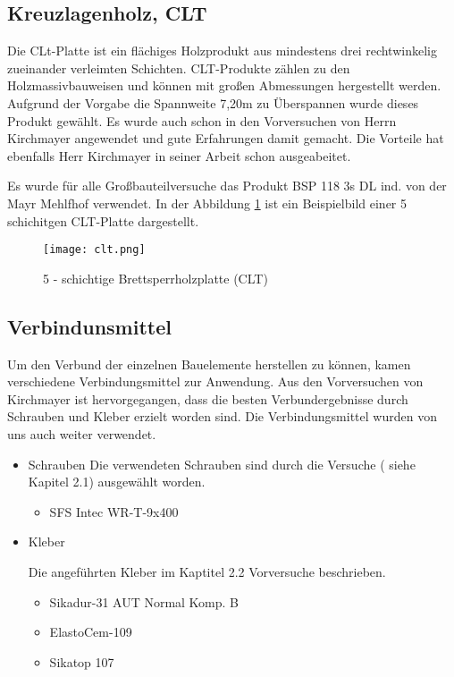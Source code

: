 \documentclass[12 pt,a4 paper ]{scrreprt}
\begin{document}
\subsection{Kreuzlagenholz, CLT}

Die CLt-Platte ist ein flächiges Holzprodukt aus mindestens drei rechtwinkelig zueinander verleimten Schichten. CLT-Produkte zählen zu den Holzmassivbauweisen und können mit großen Abmessungen hergestellt werden. Aufgrund der Vorgabe die Spannweite 7,20m zu Überspannen wurde dieses Produkt gewählt. Es wurde auch schon in den Vorversuchen von Herrn Kirchmayer angewendet und gute Erfahrungen damit gemacht. Die Vorteile hat ebenfalls Herr Kirchmayer in seiner Arbeit schon ausgeabeitet.

Es wurde für alle Großbauteilversuche das Produkt BSP 118 3s DL ind. von der Mayr Mehlfhof  verwendet. In der Abbildung \ref{clt} ist ein Beispielbild einer 5 schichitgen CLT-Platte dargestellt.

\begin{figure}[h]
\begin{center}
\texttt{[image: clt.png]}
\caption{5 - schichtige Brettsperrholzplatte (CLT)}
\label{clt}
\end{center}
\end{figure}

\subsection{Verbindunsmittel}

Um den Verbund der einzelnen Bauelemente herstellen zu können, kamen verschiedene Verbindungsmittel zur Anwendung. Aus den Vorversuchen von Kirchmayer ist hervorgegangen, dass die besten Verbundergebnisse durch Schrauben und Kleber  erzielt worden sind. Die Verbindungsmittel wurden von uns auch weiter verwendet.




\begin{itemize}
\item Schrauben
\newline
Die verwendeten Schrauben sind durch die Versuche ( siehe Kapitel 2.1) ausgewählt worden.
\newline
\begin{itemize}
\item SFS Intec WR-T-9x400
\end{itemize}

\item Kleber

Die angeführten Kleber im Kaptitel 2.2 Vorversuche beschrieben.
\newline

\begin{itemize}
\item Sikadur-31 AUT Normal Komp. B
\item ElastoCem-109 
\item Sikatop 107 
\end{itemize}

\end{itemize}
\end{document}
